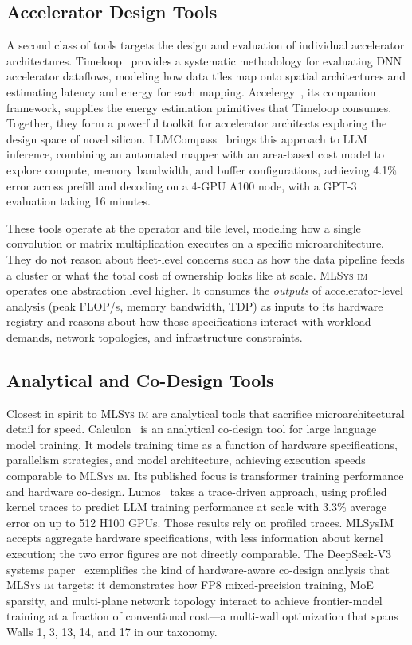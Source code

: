 \documentclass[10pt,twocolumn]{article}
\newcommand{\mlsysim}{\mbox{\textsc{MLSys}\,\textperiodcentered\,\textsc{im}}\xspace}
\begin{document}
\subsection{Accelerator Design Tools}

A second class of tools targets the design and evaluation of individual accelerator architectures. Timeloop~\citep{parashar2019} provides a systematic methodology for evaluating DNN accelerator dataflows, modeling how data tiles map onto spatial architectures and estimating latency and energy for each mapping. Accelergy~\citep{wu2019}, its companion framework, supplies the energy estimation primitives that Timeloop consumes. Together, they form a powerful toolkit for accelerator architects exploring the design space of novel silicon. LLMCompass~\citep{zhang2024} brings this approach to LLM inference, combining an automated mapper with an area-based cost model to explore compute, memory bandwidth, and buffer configurations, achieving 4.1\% error across prefill and decoding on a 4-GPU A100 node, with a GPT-3 evaluation taking 16 minutes.

These tools operate at the operator and tile level, modeling how a single convolution or matrix multiplication executes on a specific microarchitecture. They do not reason about fleet-level concerns such as how the data pipeline feeds a cluster or what the total cost of ownership looks like at scale. \mlsysim operates one abstraction level higher. It consumes the \emph{outputs} of accelerator-level analysis (peak FLOP/s, memory bandwidth, TDP) as inputs to its hardware registry and reasons about how those specifications interact with workload demands, network topologies, and infrastructure constraints.

\subsection{Analytical and Co-Design Tools}

Closest in spirit to \mlsysim are analytical tools that sacrifice microarchitectural detail for speed. Calculon~\citep{isaev2023} is an analytical co-design tool for large language model training. It models training time as a function of hardware specifications, parallelism strategies, and model architecture, achieving execution speeds comparable to \mlsysim. Its published focus is transformer training performance and hardware co-design. Lumos~\citep{liang2025lumos} takes a trace-driven approach, using profiled kernel traces to predict LLM training performance at scale with 3.3\% average error on up to 512 H100 GPUs. Those results rely on profiled traces. MLSysIM accepts aggregate hardware specifications, with less information about kernel execution; the two error figures are not directly comparable. The DeepSeek-V3 systems paper~\citep{deepseek2025v3} exemplifies the kind of hardware-aware co-design analysis that \mlsysim targets: it demonstrates how FP8 mixed-precision training, MoE sparsity, and multi-plane network topology interact to achieve frontier-model training at a fraction of conventional cost---a multi-wall optimization that spans Walls 1, 3, 13, 14, and 17 in our taxonomy.
\end{document}
